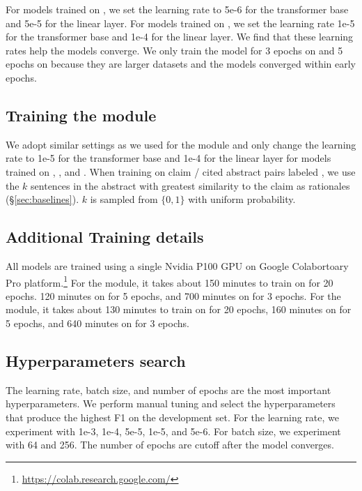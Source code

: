 For models trained on \fever, we set the learning rate to 5e-6 for the transformer base and 5e-5 for the linear layer. For models trained on \snopes, we set the learning rate 1e-5 for the transformer base and 1e-4 for the linear layer. We find that these learning rates help the models converge. We only train the model for 3 epochs on \fever and 5 epochs on \snopes because they are larger datasets and the models converged within early epochs.


\subsection{Training the \componentthree module}

We adopt similar settings as we used for the \componenttwo module and only change the learning rate to 1e-5 for the transformer base and 1e-4 for the linear layer for models trained on \ours, \fever, and \snopes. When training on claim / cited abstract pairs labeled \notenough, we use the $k$ sentences in the abstract with greatest similarity to the claim as rationales (\S\ref{sec:baselines}). $k$ is sampled from $\{0, 1\}$ with uniform probability.



\subsection{Additional Training details}

All models are trained using a single Nvidia P100 GPU on Google Colabortoary Pro platform.\footnote{\url{https://colab.research.google.com/}} For the \componenttwo module, it takes about 150 minutes to train on \ours for 20 epochs. 120 minutes on \snopes for 5 epochs, and 700 minutes on \fever for 3 epochs. For the \componentthree module, it takes about 130 minutes to train on \ours for 20 epochs, 160 minutes on \snopes for 5 epochs, and 640 minutes on \fever for 3 epochs.



\subsection{Hyperparameters search}

The learning rate, batch size, and number of epochs are the most important hyperparameters. We perform manual tuning and select the hyperparameters that produce the highest F1 on the development set. For the learning rate, we experiment with 1e-3, 1e-4, 5e-5, 1e-5, and 5e-6. For batch size, we experiment with 64 and 256. The number of epochs are cutoff after the model converges.

